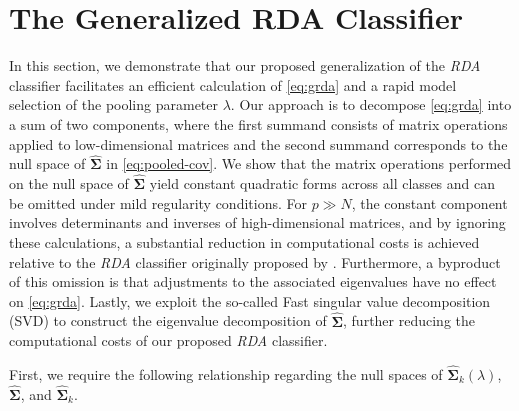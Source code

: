 \documentclass[11pt]{article}
\begin{document}
\section{The Generalized RDA Classifier}
In this section, we demonstrate that our proposed generalization of the \emph{RDA} classifier facilitates an efficient calculation of \eqref{eq:grda} and a rapid model selection of the pooling parameter $\lambda$. Our approach is to decompose \eqref{eq:grda} into a sum of two components, where the first summand consists of matrix operations applied to low-dimensional matrices and the second summand corresponds to the null space of $\widehat{\bm \Sigma}$ in \eqref{eq:pooled-cov}. We show that the matrix operations performed on the null space of $\widehat{\bm \Sigma}$ yield constant quadratic forms across all classes and can be omitted under mild regularity conditions. For $p \gg N$, the constant component involves determinants and inverses of high-dimensional matrices, and by ignoring these calculations, a substantial reduction in computational costs is achieved relative to the \emph{RDA} classifier originally proposed by \cite{Friedman:1989tm}. Furthermore, a byproduct of this omission is that adjustments to the associated eigenvalues have no effect on \eqref{eq:grda}. Lastly, we exploit the so-called Fast singular value decomposition (SVD) to construct the eigenvalue decomposition of $\widehat{\bm \Sigma}$, further reducing the computational costs of our proposed \emph{RDA} classifier.

First, we require the following relationship regarding the null spaces of $\widehat{\bm \Sigma}_k(\lambda)$, $\widehat{\bm \Sigma}$, and $\widehat{\bm \Sigma}_k$.
\end{document}
